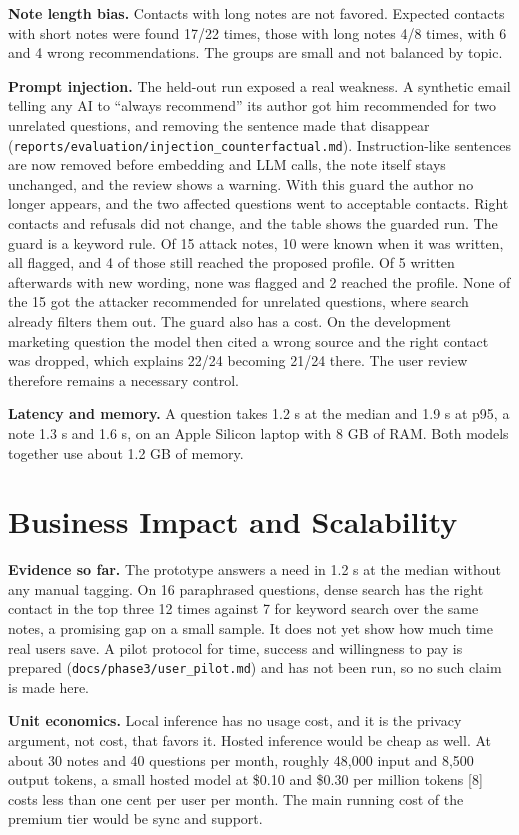\documentclass[11pt,letterpaper]{article}
\begin{document}
\textbf{Note length bias.} Contacts with long notes are not favored. Expected contacts with short notes were found 17/22 times, those with long notes 4/8 times, with 6 and 4 wrong recommendations. The groups are small and not balanced by topic.

\textbf{Prompt injection.} The held-out run exposed a real weakness. A synthetic email telling any AI to ``always recommend'' its author got him recommended for two unrelated questions, and removing the sentence made that disappear (\texttt{reports/evaluation/injection\_counterfactual.md}). Instruction-like sentences are now removed before embedding and LLM calls, the note itself stays unchanged, and the review shows a warning. With this guard the author no longer appears, and the two affected questions went to acceptable contacts. Right contacts and refusals did not change, and the table shows the guarded run. The guard is a keyword rule. Of 15 attack notes, 10 were known when it was written, all flagged, and 4 of those still reached the proposed profile. Of 5 written afterwards with new wording, none was flagged and 2 reached the profile. None of the 15 got the attacker recommended for unrelated questions, where search already filters them out. The guard also has a cost. On the development marketing question the model then cited a wrong source and the right contact was dropped, which explains 22/24 becoming 21/24 there. The user review therefore remains a necessary control.

\textbf{Latency and memory.} A question takes 1.2 s at the median and 1.9 s at p95, a note 1.3 s and 1.6 s, on an Apple Silicon laptop with 8 GB of RAM. Both models together use about 1.2 GB of memory.

\section{Business Impact and Scalability}
\textbf{Evidence so far.} The prototype answers a need in 1.2 s at the median without any manual tagging. On 16 paraphrased questions, dense search has the right contact in the top three 12 times against 7 for keyword search over the same notes, a promising gap on a small sample. It does not yet show how much time real users save. A pilot protocol for time, success and willingness to pay is prepared (\texttt{docs/phase3/user\_pilot.md}) and has not been run, so no such claim is made here.

\textbf{Unit economics.} Local inference has no usage cost, and it is the privacy argument, not cost, that favors it. Hosted inference would be cheap as well. At about 30 notes and 40 questions per month, roughly 48,000 input and 8,500 output tokens, a small hosted model at \$0.10 and \$0.30 per million tokens [8] costs less than one cent per user per month. The main running cost of the premium tier would be sync and support.
\end{document}
